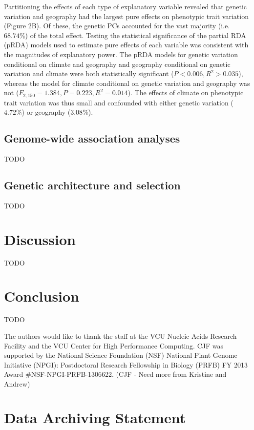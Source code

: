 \documentclass[smallextended]{svjour3}
\begin{document}
Partitioning the effects of each type of explanatory variable revealed that
genetic variation and geography had the largest pure effects on phenotypic trait
variation (Figure 2B). Of these, the genetic PCs accounted for the vast majority
(i.e. $68.74\%$) of the total effect. Testing the statistical significance of
the partial RDA (pRDA) models used to estimate pure effects of each variable was
consistent with the magnitudes of explanatory power. The pRDA models for genetic
variation conditional on climate and geography and geography conditional on
genetic variation and climate were both statistically significant ($P < 0.006,
R^2 > 0.035$), whereas the model for climate conditional on genetic variation
and geography was not ($F_{2,150} = 1.384, P = 0.223, R^2 = 0.014$). The effects
of climate on phenotypic trait variation was thus small and confounded with
either genetic variation ($4.72\%$) or geography ($3.08\%$).


\subsection*{Genome-wide association analyses}
TODO

\subsection*{Genetic architecture and selection}
TODO

\section*{Discussion}
TODO


\section*{Conclusion}
TODO


\begin{acknowledgements} The authors would like to thank the staff at
the VCU Nucleic Acids Research Facility and the
VCU Center for High Performance Computing.  CJF was supported by the National
Science Foundation (NSF) National Plant Genome Initiative (NPGI): Postdoctoral
Research Fellowship in Biology (PRFB) FY 2013 Award \#NSF-NPGI-PRFB-1306622.
(CJF - Need more from Kristine and Andrew)
\end{acknowledgements}

\section*{Data Archiving Statement}
\end{document}
